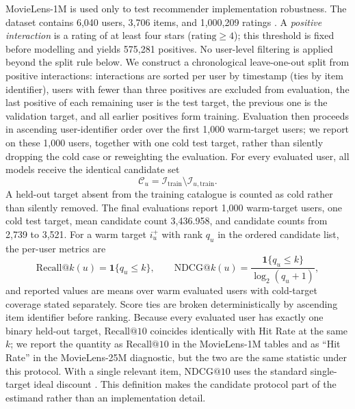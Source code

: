 \documentclass[review]{elsarticle}
\makeatletter
\theoremstyle{plain}
\theoremstyle{definition}
\theoremstyle{remark}
\newcommand{\NDCG}{\mathrm{NDCG@10}}
\newcommand{\Recall}{\mathrm{Recall@10}}
\makeatother
\begin{document}
MovieLens-1M is used only to test recommender implementation robustness. The dataset contains 6,040 users, 3,706 items, and 1,000,209 ratings \cite{harper2015movielens}. A \emph{positive interaction} is a rating of at least four stars ($\mathrm{rating}\geq4$); this threshold is fixed before modelling and yields 575,281 positives. No user-level filtering is applied beyond the split rule below. We construct a chronological leave-one-out split from positive interactions: interactions are sorted per user by timestamp (ties by item identifier), users with fewer than three positives are excluded from evaluation, the last positive of each remaining user is the test target, the previous one is the validation target, and all earlier positives form training. Evaluation then proceeds in ascending user-identifier order over the first 1,000 warm-target users; we report on these 1,000 users, together with one cold test target, rather than silently dropping the cold case or reweighting the evaluation. For every evaluated user, all models receive the identical candidate set
\begin{equation}
 \mathcal{C}_u=\mathcal{I}_{\mathrm{train}}\setminus\mathcal{I}_{u,\mathrm{train}}.
\label{eq:candidates}
\end{equation}
A held-out target absent from the training catalogue is counted as cold rather than silently removed. The final evaluations report 1,000 warm-target users, one cold test target, mean candidate count 3,436.958, and candidate counts from 2,739 to 3,521. For a warm target $i_u^+$ with rank $q_u$ in the ordered candidate list, the per-user metrics are
\begin{equation}
 \mathrm{Recall@}k(u)=\mathbf{1}\{q_u\leq k\},\qquad
 \mathrm{NDCG@}k(u)=\frac{\mathbf{1}\{q_u\leq k\}}{\log_2(q_u+1)},
\label{eq:ranking-metrics}
\end{equation}
and reported values are means over warm evaluated users with cold-target coverage stated separately. Score ties are broken deterministically by ascending item identifier before ranking. Because every evaluated user has exactly one binary held-out target, $\Recall$ coincides identically with Hit Rate at the same $k$; we report the quantity as $\Recall$ in the MovieLens-1M tables and as ``Hit Rate'' in the MovieLens-25M diagnostic, but the two are the same statistic under this protocol. With a single relevant item, $\NDCG$ uses the standard single-target ideal discount \cite{jarvelin2002cumulated}. This definition makes the candidate protocol part of the estimand rather than an implementation detail.
\end{document}
